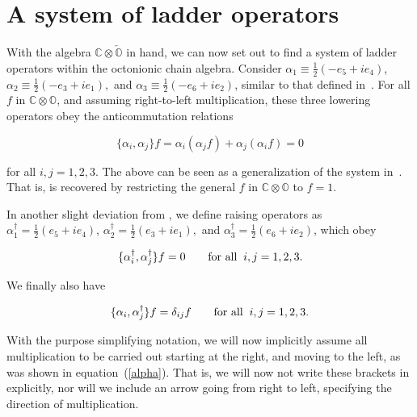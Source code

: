 \documentclass[letterpaper,12pt,titlepage,oneside,final]{book}
\newcommand{\COOO}{\mathbb{C}\otimes\overleftarrow{\mathbb{O}}}
\begin{document}

\section{A system of ladder operators\label{syst}  }


With the algebra $\COOO$ in hand, we can now set out to find a system of ladder operators within the octonionic chain algebra.  Consider $\alpha_1 \equiv \frac{1}{2}\left(-e_5+ie_4\right)$,  $\alpha_2 \equiv \frac{1}{2}\left(-e_3+ie_1\right),$ and $\alpha_3 \equiv \frac{1}{2}\left(-e_6+ie_2\right)$, similar to that defined in~\cite{GGquarks}.  For all $f$ in $\mathbb{C}\otimes\mathbb{O}$, and assuming right-to-left multiplication, these three lowering operators obey the anticommutation relations

\begin{equation}\label{alpha}
\{\alpha_i, \alpha_j\}f =\alpha_i(\alpha_jf)+\alpha_j (\alpha_if) = 0 
\end{equation}

\noindent for all $i,j = 1,2,3.$  The above can be seen as a generalization of the system in~\cite{GGstats}.  That is, \cite{GGstats} is recovered by restricting the general $f$ in $\mathbb{C}\otimes\mathbb{O}$ to $f=1$.  

In another slight deviation from \cite{GGstats}, we define raising operators as $\alpha_1^{\dagger} = \frac{1}{2}\left(e_5+ie_4\right)$,  $\alpha_2^{\dagger} = \frac{1}{2}\left(e_3+ie_1\right),$ and $\alpha_3^{\dagger} = \frac{1}{2}\left(e_6+ie_2\right)$, which obey

\begin{equation}\label{alphad}
\{\alpha_i^{\dagger}, \alpha_j^{\dagger}\}f = 0 \hspace{0.7cm}\textup{for all} \hspace{0.2cm} i,j = 1,2,3.
\end{equation}

\noindent We finally also have 

\begin{equation}\label{alphaalphad}
\{\alpha_i,\alpha_j^{\dagger}\}f=\delta_{ij}f \hspace{0.7cm} \textup{for all} \hspace{0.2cm}i,j = 1,2,3.
\end{equation}

With the purpose simplifying notation, we will now implicitly assume all multiplication to be carried out starting at the right, and moving to the left, as was shown in equation~(\ref{alpha}).  That is, we will now not write these brackets in explicitly, nor will we include an arrow going from right to left, specifying the direction of multiplication.   
\end{document}

